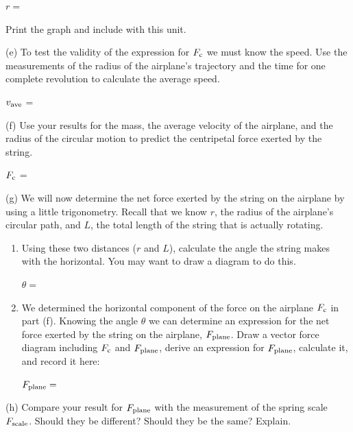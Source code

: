 \hspace{0.5in} $r =$
\vspace{5mm}

Print the graph and include with this unit.

(e) To test the validity of the expression for \( F_{\rm c} \) we must know the
speed. Use the measurements of the radius of the airplane's trajectory and the
time for one complete revolution to calculate the average speed.
\vspace{5mm}

\hspace{0.5in} \( v_{\rm ave} \) = 
\vspace{5mm}

(f) Use your results for the mass, the average velocity of the airplane, and
the radius of the circular motion to predict the centripetal force exerted by
the string.
\vspace{5mm}

\hspace{0.5in} \( F_{\rm c} \) = 
\vspace{5mm}

(g) We will now determine the net force exerted by the string on the airplane
by using a little trigonometry.
Recall that we know $r$, the radius of the airplane's circular path, and 
$L$, the total length of the string that is actually rotating. 

\begin{enumerate}
\item Using these two distances ($r$ and $L$), 
calculate the angle the string makes with
the horizontal. You may want to draw a diagram to do this. 

\bigskip
\( \theta  =\)  \vspace{20mm}

\item We determined the horizontal component of the force on the airplane 
\( F_{\rm c} \) in part (f). Knowing the angle \( \theta \) we can determine an
expression for the
net force exerted by the string on the airplane, \( F_{\rm plane} \). Draw a vector
force diagram including \( F_{\rm c} \) and \( F_{\rm plane} \), derive an expression
for \( F_{\rm plane} \), calculate it, and record it here: 

\bigskip
\( F_{\rm plane} =\)  \vspace{10mm}

\end{enumerate}
(h) Compare your result for \( F_{\rm plane} \) with the measurement of the spring
scale \( F_{\rm scale} \). Should they be different? Should they be the same? Explain.
\vspace{15mm}


